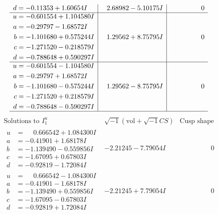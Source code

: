 \documentclass[1p]{elsarticle_modified}
\theoremstyle{definition}
\newcommand{\I}{\sqrt{-1}}
\begin{document}
$$\begin{array}{c|c|c}
\begin{aligned}
d &= -0.11353 + 1.60654 I\end{aligned}
 & \phantom{-}2.68982 - 5.10175 I & \phantom{-0.000000 } 0 \\ \hline\begin{aligned}
u &= -0.601554 + 1.104580 I \\
a &= -0.29797 - 1.68572 I \\
b &= -1.101680 + 0.575244 I \\
c &= -1.271520 - 0.218579 I \\
d &= -0.788648 + 0.590297 I\end{aligned}
 & \phantom{-}1.29562 + 8.75795 I & \phantom{-0.000000 } 0 \\ \hline\begin{aligned}
u &= -0.601554 - 1.104580 I \\
a &= -0.29797 + 1.68572 I \\
b &= -1.101680 - 0.575244 I \\
c &= -1.271520 + 0.218579 I \\
d &= -0.788648 - 0.590297 I\end{aligned}
 & \phantom{-}1.29562 - 8.75795 I & \phantom{-0.000000 } 0\\
 \hline 
 \end{array}$$\newpage$$\begin{array}{c|c|c}  
\text{Solutions to }I^u_{1}& \I (\text{vol} + \sqrt{-1}CS) & \text{Cusp shape}\\
 \hline 
\begin{aligned}
u &= \phantom{-}0.666542 + 1.084300 I \\
a &= -0.41901 + 1.68178 I \\
b &= -1.139490 - 0.559856 I \\
c &= -1.67095 + 0.67803 I \\
d &= -0.92819 - 1.72084 I\end{aligned}
 & -2.21245 - 7.79054 I & \phantom{-0.000000 } 0 \\ \hline\begin{aligned}
u &= \phantom{-}0.666542 - 1.084300 I \\
a &= -0.41901 - 1.68178 I \\
b &= -1.139490 + 0.559856 I \\
c &= -1.67095 - 0.67803 I \\
d &= -0.92819 + 1.72084 I\end{aligned}
 & -2.21245 + 7.79054 I & \phantom{-0.000000 } 0 \\ \hline\begin{aligned}

\end{aligned}
\end{array}$$
\end{document}
